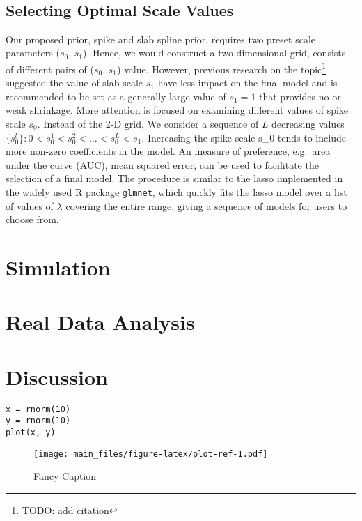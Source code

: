 \documentclass[AMA,STIX1COL,]{WileyNJD-v2}
\begin{document}
~

\hypertarget{selecting-optimal-scale-values}{%
\subsection{Selecting Optimal Scale
Values}\label{selecting-optimal-scale-values}}

Our proposed prior, spike and slab spline prior, requires two preset
scale parameters (\(s_0\), \(s_1\)). Hence, we would construct a two
dimensional grid, consists of different pairs of (\(s_0\), \(s_1\))
value. However, previous research on the topic\footnote{TODO: add
  citation} suggested the value of slab scale \(s_1\) have less impact
on the final model and is recommended to be set as a generally large
value of \(s_1 = 1\) that provides no or weak shrinkage. More attention
is focused on examining different values of spike scale \(s_0\). Instead
of the 2-D grid, We consider a sequence of \(L\) decreasing values
\(\{s_0^l\}: 0 < s_0^1 < s_0^2 < \dots < s_0^L < s_1\). Increasing the
spike scale s\_0 tends to include more non-zero coefficients in the
model. An measure of preference, e.g.~area under the curve (AUC), mean
squared error, can be used to facilitate the selection of a final model.
The procedure is similar to the lasso implemented in the widely used R
package \texttt{glmnet}, which quickly fits the lasso model over a list
of values of \(\lambda\) covering the entire range, giving a sequence of
models for users to choose from.

\hypertarget{simulation}{%
\section{Simulation}\label{simulation}}

\hypertarget{real-data-analysis}{%
\section{Real Data Analysis}\label{real-data-analysis}}

\hypertarget{discussion}{%
\section{Discussion}\label{discussion}}

\begin{verbatim}
x = rnorm(10)
y = rnorm(10)
plot(x, y)
\end{verbatim}

\begin{figure}
\centering
\texttt{[image: main\_files/figure-latex/plot-ref-1.pdf]}
\caption{Fancy Caption\label{fig:plot}}
\end{figure}
\end{document}
